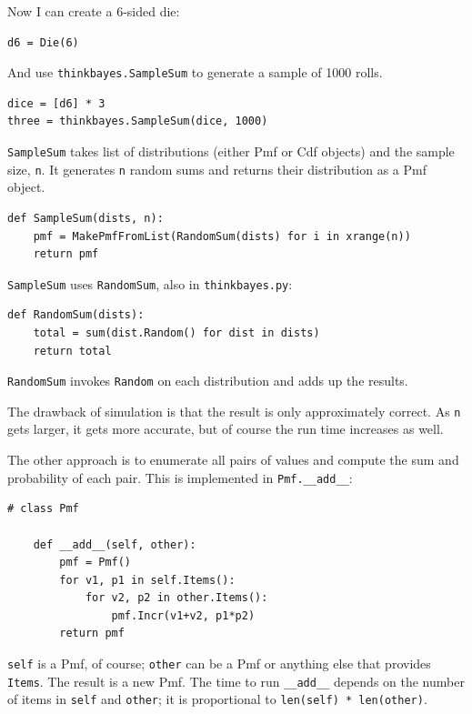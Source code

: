 \documentclass[12pt]{book}
\begin{document}
Now I can create a 6-sided die:

\begin{verbatim}
d6 = Die(6)
\end{verbatim}

And use \verb"thinkbayes.SampleSum" to generate a sample of 1000 rolls.

\begin{verbatim}
dice = [d6] * 3
three = thinkbayes.SampleSum(dice, 1000)
\end{verbatim}

\verb"SampleSum" takes list of distributions (either Pmf or Cdf
objects) and the sample size, {\tt n}.  It generates {\tt n} random
sums and returns their distribution as a Pmf object.

\begin{verbatim}
def SampleSum(dists, n):
    pmf = MakePmfFromList(RandomSum(dists) for i in xrange(n))
    return pmf
\end{verbatim}

\verb"SampleSum" uses \verb"RandomSum", also in \verb"thinkbayes.py":

\begin{verbatim}
def RandomSum(dists):
    total = sum(dist.Random() for dist in dists)
    return total
\end{verbatim}

{\tt RandomSum} invokes {\tt Random} on each distribution and
adds up the results.

The drawback of simulation is that the result
is only approximately correct.  As \verb"n" gets larger, it gets
more accurate, but of course the run time increases as well.

The other approach is to enumerate all pairs of values and
compute the sum and probability of each pair.  This is implemented
in \verb"Pmf.__add__":

\begin{verbatim}
# class Pmf

    def __add__(self, other):
        pmf = Pmf()
        for v1, p1 in self.Items():
            for v2, p2 in other.Items():
                pmf.Incr(v1+v2, p1*p2)
        return pmf
\end{verbatim}

{\tt self} is a Pmf, of course; {\tt other} can be a Pmf or anything
else that provides {\tt Items}.  The result is a new Pmf.  The time to
run \verb"__add__" depends on the number of items in {\tt self} and
{\tt other}; it is proportional to {\tt len(self) * len(other)}.
\end{document}
